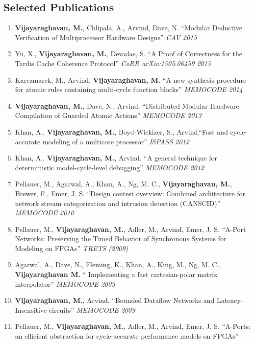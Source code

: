 \documentclass[margin]{resume}
\begin{document}
\begin{resume}
    \section{\mysidestyle Selected Publications}
    \begin{enumerate}
    \item \textbf{Vijayaraghavan, M.}, Chlipala, A., Arvind, Dave, N.
    ``Modular Deductive Verification of Multiprocessor Hardware Designs'' \textit{CAV 2015}
    \item Yu, X., \textbf{Vijayaraghavan, M.}, Devadas, S.
    ``A Proof of Correctness for the Tardis Cache Coherence Protocol'' \textit{CoRR arXiv:1505.06459 2015}
    \item Karczmarek, M., Arvind, \textbf{Vijayaraghavan, M.}
    ``A new synthesis procedure for atomic rules containing multi-cycle function blocks'' \textit{MEMOCODE 2014}
    \item \textbf{Vijayaraghavan, M.}, Dave, N., Arvind.
    ``Distributed Modular Hardware Compilation of Guarded Atomic Actions'' \textit{MEMOCODE 2013}
    \item Khan, A., \textbf{Vijayaraghavan, M.}, Boyd-Wickizer, S., Arvind.``Fast and cycle-accurate modeling of 
    a multicore processor''
    \textit {ISPASS 2012}
    \item Khan, A., \textbf{Vijayaraghavan, M.}, Arvind. ``A general technique for deterministic model-cycle-level debugging''
    \textit{MEMOCODE 2012}
    \item Pellauer, M., Agarwal, A., Khan, A., Ng, M. C., \textbf{Vijayaraghavan, M.}, Brewer, F., Emer, J. S. 
    ``Design contest overview: Combined architecture for network stream categorization and intrusion detection (CANSCID)''
    \textit{MEMOCODE 2010}
    \item Pellauer, M., \textbf{Vijayaraghavan, M.}, Adler, M., Arvind, Emer, J. S.
    ``A-Port Networks: Preserving the Timed Behavior of Synchronous Systems for
    Modeling on FPGAs'' \textit{TRETS (2009)}
    \item Agarwal, A., Dave, N., Fleming, K., Khan, A., King, M., Ng, M. C., \textbf{Vijayaraghavan M.} ``
    Implementing a fast cartesian-polar matrix interpolator'' \textit{MEMOCODE 2009}
    \item \textbf{Vijayaraghavan, M.}, Arvind. ``Bounded Dataflow Networks and
    Latency-Insensitive circuits'' \textit{MEMOCODE 2009}
    \item Pellauer, M.,
    \textbf{Vijayaraghavan, M.}, Adler, M., Arvind, Emer, J. S. ``A-Ports: an
    efficient abstraction for cycle-accurate performance models on FPGAs''

\end{enumerate}
\end{resume}
\end{document}
